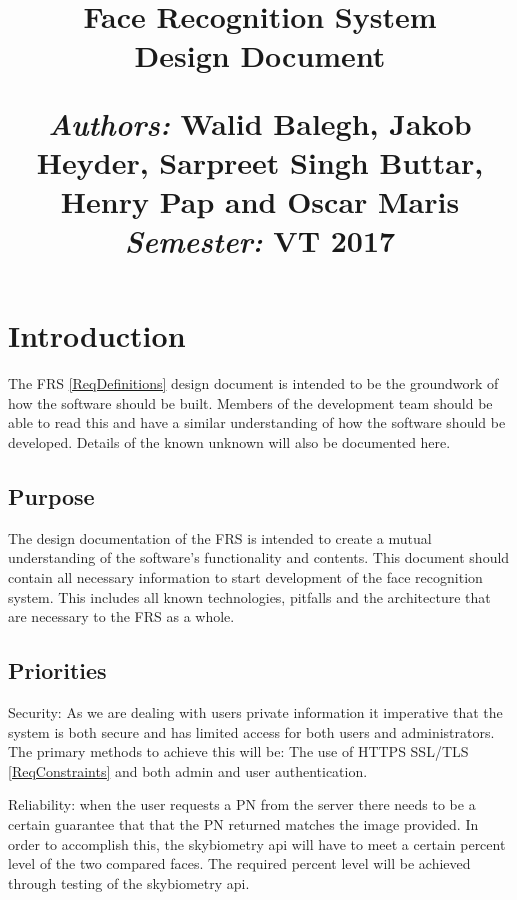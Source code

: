 \documentclass[a4paper,11pt]{article}
\title{
\vspace{-8cm}
\begin{flushleft}
    \vspace{10cm}
    \normalfont \normalsize
    \vspace{-1.3cm}
\end{flushleft}
\vspace{3cm}
\begin{flushleft}
    \huge Face Recognition System \\
    \LARGE  Design Document\\
\end{flushleft}
\null
\vfill
\begin{minipage}{\textwidth}
\begin{flushleft} \large
\emph{Authors:} Walid Balegh, Jakob Heyder, Sarpreet Singh Buttar, Henry \hspace{45pt} Pap and Oscar Maris \\ %
\emph{Semester:} VT 2017\\ %
\end{flushleft}
\end{minipage}
}
\date{}
\begin{document}
\maketitle

\newpage

\tableofcontents

\newpage


\section{Introduction}
The FRS \ref{ReqDefinitions} design document is intended to be the groundwork of how the software should be built. Members of the development team should be able to read this and have a similar understanding of how the software should be developed. Details of the known unknown will also be documented here.

\subsection{Purpose}
The design documentation of the FRS is intended to create a mutual understanding of the software's functionality and contents. This document should contain all necessary information to start development of the face recognition system. This includes all known technologies, pitfalls and the architecture that are necessary to the FRS as a whole. 


\subsection{Priorities}

Security: As we are dealing with users private information it imperative that the system is both secure and has limited access for both users and administrators. The primary methods to achieve this will be: The use of HTTPS SSL/TLS \ref{ReqConstraints}  and both admin and user authentication.

Reliability: when the user requests a PN from the server there needs to be a certain guarantee that that the PN returned matches the image provided. In order to accomplish this, the skybiometry api will have to meet a certain percent level of the two compared faces. The required percent level will be achieved through testing of the skybiometry api.
\end{document}
